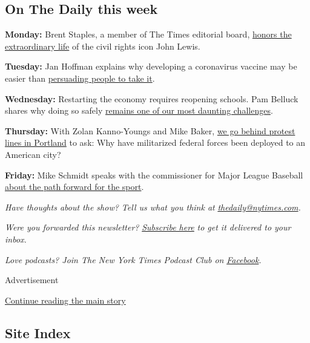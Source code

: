 \hypertarget{on-the-daily-this-week}{%
\subsection{On The Daily this week}\label{on-the-daily-this-week}}

\textbf{Monday:} Brent Staples, a member of The Times editorial board,
\href{https://www.nytimes.com/2020/07/20/podcasts/the-daily/john-lewis.html}{honors
the extraordinary life} of the civil rights icon John Lewis.

\textbf{Tuesday:} Jan Hoffman explains why developing a coronavirus
vaccine may be easier than
\href{https://www.nytimes.com/2020/07/21/podcasts/the-daily/coronavirus-vaccine.html}{persuading
people to take it}.

\textbf{Wednesday:} Restarting the economy requires reopening schools.
Pam Belluck shares why doing so safely
\href{https://www.nytimes.com/2020/07/22/podcasts/the-daily/school-reopenings-coronavirus.html}{remains
one of our most daunting challenges}.

\textbf{Thursday:} With Zolan Kanno-Youngs and Mike Baker,
\href{https://www.nytimes.com/2020/07/23/podcasts/the-daily/portland-protests.html}{we
go behind protest lines in Portland} to ask: Why have militarized
federal forces been deployed to an American city?

\textbf{Friday:} Mike Schmidt speaks with the commissioner for Major
League Baseball
\href{https://www.nytimes.com/2020/07/24/podcasts/the-daily/mlb-baseball-season-coronavirus.html?action=click\&module=Briefings\&pgtype=Homepage}{about
the path forward for the sport}.

\emph{Have thoughts about the show? Tell us what you think at}
\href{mailto:thedaily@nytimes.com?subject=The\%20Daily\%20newsletter}{\emph{thedaily@nytimes.com}}\emph{.}

\emph{Were you forwarded this newsletter?}
\href{https://www.nytimes.com/newsletters/the-daily?te=1\&nl=the-daily\&emc=edit_dy_20190627}{\emph{Subscribe
here}} \emph{to get it delivered to your inbox.}

\emph{Love podcasts? Join The New York Times Podcast Club on}
\href{https://www.facebook.com/groups/nytpodcastclub}{\emph{Facebook}}\emph{.}

Advertisement

\protect\hyperlink{after-bottom}{Continue reading the main story}

\hypertarget{site-index}{%
\subsection{Site Index}\label{site-index}}

